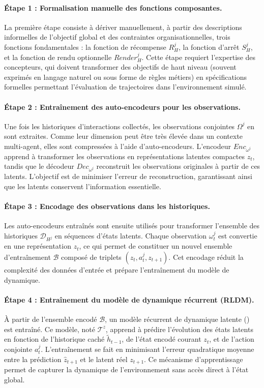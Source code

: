 \paragraph{Étape 1 : Formalisation manuelle des fonctions composantes.}
La première étape consiste à dériver manuellement, à partir des descriptions informelles de l’objectif global et des contraintes organisationnelles, trois fonctions fondamentales : la fonction de récompense $R^j_H$, la fonction d’arrêt $S^j_H$, et la fonction de rendu optionnelle $Render^j_H$.
Cette étape requiert l’expertise des concepteurs, qui doivent transformer des objectifs de haut niveau (souvent exprimés en langage naturel ou sous forme de règles métiers) en spécifications formelles permettant l’évaluation de trajectoires dans l’environnement simulé.

\paragraph{Étape 2 : Entraînement des auto-encodeurs pour les observations.}
Une fois les historiques d’interactions collectés, les observations conjointes $\Omega^j$ en sont extraites.
Comme leur dimension peut être très élevée dans un contexte multi-agent, elles sont compressées à l’aide d’auto-encodeurs.
L’encodeur $Enc_{\omega^j}$ apprend à transformer les observations en représentations latentes compactes $z_t$, tandis que le décodeur $Dec_{\omega^j}$ reconstruit les observations originales à partir de ces latents.
L’objectif est de minimiser l’erreur de reconstruction, garantissant ainsi que les latents conservent l’information essentielle.

\paragraph{Étape 3 : Encodage des observations dans les historiques.}
Les auto-encodeurs entraînés sont ensuite utilisés pour transformer l’ensemble des historiques $\mathcal{D}_{H^j}$ en séquences d’états latents.
Chaque observation $\omega_t^j$ est convertie en une représentation $z_t$, ce qui permet de constituer un nouvel ensemble d’entraînement $\mathcal{B}$ composé de triplets $(z_t, a_t^j, z_{t+1})$.
Cet encodage réduit la complexité des données d’entrée et prépare l’entraînement du modèle de dynamique.

\paragraph{Étape 4 : Entraînement du modèle de dynamique récurrent (RLDM).}
À partir de l’ensemble encodé $\mathcal{B}$, un modèle récurrent de dynamique latente () est entraîné.
Ce modèle, noté $\mathcal{T}^z$, apprend à prédire l’évolution des états latents en fonction de l’historique caché $\tilde{h}_{t-1}$, de l’état encodé courant $z_t$, et de l’action conjointe $a_t^j$.
L’entraînement se fait en minimisant l’erreur quadratique moyenne entre la prédiction $\hat{z}_{t+1}$ et le latent réel $z_{t+1}$.
Ce mécanisme d’apprentissage permet de capturer la dynamique de l’environnement sans accès direct à l’état global.

